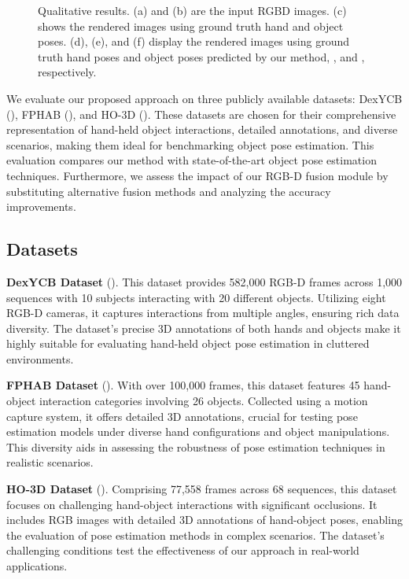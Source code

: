 \begin{figure}[h!]
  \caption{Qualitative results. (a) and (b) are the input RGBD images. (c) shows the rendered images using ground truth hand and object poses. (d), (e), and (f) display the rendered images using ground truth hand poses and object poses predicted by our method, \cite{wang2019densefusion}, and \cite{castro2023crt}, respectively.}
  \label{fig:result}
\end{figure}

We evaluate our proposed approach on three publicly available datasets: DexYCB (\cite{chao2021dexycb}), FPHAB (\cite{garcia2018first}), and HO-3D (\cite{hampali2020honnotate}). These datasets are chosen for their comprehensive representation of hand-held object interactions, detailed annotations, and diverse scenarios, making them ideal for benchmarking object pose estimation. This evaluation compares our method with state-of-the-art object pose estimation techniques. Furthermore, we assess the impact of our RGB-D fusion module by substituting alternative fusion methods and analyzing the accuracy improvements.

\subsection{Datasets}

\textbf{DexYCB Dataset} (\cite{chao2021dexycb}). This dataset provides 582,000 RGB-D frames across 1,000 sequences with 10 subjects interacting with 20 different objects. Utilizing eight RGB-D cameras, it captures interactions from multiple angles, ensuring rich data diversity. The dataset's precise 3D annotations of both hands and objects make it highly suitable for evaluating hand-held object pose estimation in cluttered environments.

\textbf{FPHAB Dataset} (\cite{garcia2018first}). With over 100,000 frames, this dataset features 45 hand-object interaction categories involving 26 objects. Collected using a motion capture system, it offers detailed 3D annotations, crucial for testing pose estimation models under diverse hand configurations and object manipulations. This diversity aids in assessing the robustness of pose estimation techniques in realistic scenarios.

\textbf{HO-3D Dataset} (\cite{hampali2020honnotate}). Comprising 77,558 frames across 68 sequences, this dataset focuses on challenging hand-object interactions with significant occlusions. It includes RGB images with detailed 3D annotations of hand-object poses, enabling the evaluation of pose estimation methods in complex scenarios. The dataset's challenging conditions test the effectiveness of our approach in real-world applications.

